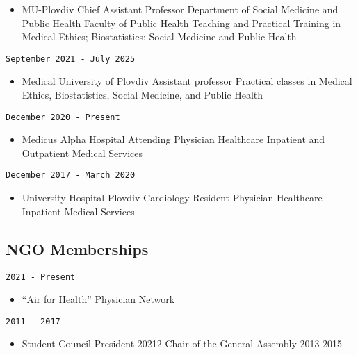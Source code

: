 \documentclass[
  12pt,
  letterpaper,
  DIV=11,
  numbers=noendperiod]{scrartcl}
\providecommand{\tightlist}{%
  \setlength{\itemsep}{0pt}\setlength{\parskip}{0pt}}\usepackage{longtable,booktabs,array}
\begin{document}
\begin{itemize}
\tightlist
\item
  MU-Plovdiv \textbar{} Chief Assistant Professor \textbar{} Department
  of Social Medicine and Public Health \textbar{} Faculty of Public
  Health \textbar{} Teaching and Practical Training in Medical Ethics;
  Biostatistics; Social Medicine and Public Health
\end{itemize}

\texttt{September\ 2021\ -\ July\ 2025}

\begin{itemize}
\tightlist
\item
  Medical University of Plovdiv \textbar{} Assistant professor
  \textbar{} Practical classes in Medical Ethics, Biostatistics, Social
  Medicine, and Public Health
\end{itemize}

\texttt{December\ 2020\ -\ Present}

\begin{itemize}
\tightlist
\item
  Medicus Alpha Hospital \textbar{} Attending Physician \textbar{}
  Healthcare \textbar{} Inpatient and Outpatient Medical Services
\end{itemize}

\texttt{December\ 2017\ -\ March\ 2020}

\begin{itemize}
\tightlist
\item
  University Hospital Plovdiv \textbar{} Cardiology Resident Physician
  \textbar{} Healthcare \textbar{} Inpatient Medical Services
\end{itemize}

\subsection{NGO Memberships}\label{ngo-memberships}

\texttt{2021\ -\ Present}

\begin{itemize}
\tightlist
\item
  ``Air for Health'' Physician Network
\end{itemize}

\texttt{2011\ -\ 2017}

\begin{itemize}
\tightlist
\item
  Student Council \textbar{} President 20212 \textbar{} Chair of the
  General Assembly 2013-2015
\end{itemize}
\end{document}
